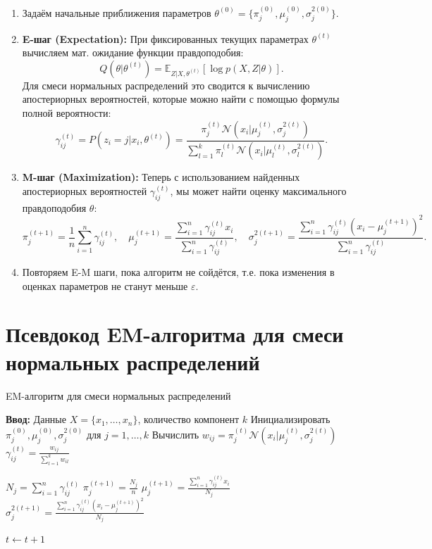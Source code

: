 \begin{enumerate}
    \item Задаём начальные приближения параметров $\theta^{(0)} = \{\pi_j^{(0)}, \mu_j^{(0)}, \sigma_j^{2(0)}\}$.
    \item \textbf{E-шаг (Expectation):} При фиксированных текущих параметрах $\theta^{(t)}$ вычисляем мат. ожидание функции правдоподобия:
    \[
    Q(\theta|\theta^{(t)}) = \mathbb{E}_{Z|X,\theta^{(t)}}[\log p(X,Z|\theta)].
    \]
    Для смеси нормальных распределений это сводится к вычислению апостериорных вероятностей, которые можно найти с помощью формулы полной вероятности:
    \[
    \gamma_{ij}^{(t)} = P(z_i = j | x_i, \theta^{(t)}) = \frac{\pi_j^{(t)}\mathcal{N}(x_i|\mu_j^{(t)},\sigma_j^{2(t)})}{\sum_{l=1}^k \pi_l^{(t)}\mathcal{N}(x_i|\mu_l^{(t)},\sigma_l^{2(t)})}.
    \]

    \item \textbf{M-шаг (Maximization):} Теперь с использованием найденных апостериорных вероятностей $\gamma_{ij}^{(t)}$, мы может найти оценку максимального правдоподобия $\theta$:
    \[
    \pi_j^{(t+1)} = \frac{1}{n}\sum_{i=1}^n \gamma_{ij}^{(t)},\quad
    \mu_j^{(t+1)} = \frac{\sum_{i=1}^n \gamma_{ij}^{(t)} x_i}{\sum_{i=1}^n \gamma_{ij}^{(t)}},\quad
    \sigma_j^{2(t+1)} = \frac{\sum_{i=1}^n \gamma_{ij}^{(t)} (x_i - \mu_j^{(t+1)})^2}{\sum_{i=1}^n \gamma_{ij}^{(t)}}.
    \]

    \item Повторяем E-M шаги, пока алгоритм не сойдётся, т.е. пока изменения в оценках параметров не станут меньше $\varepsilon$.
\end{enumerate}

\section*{\textbf{Псевдокод EM-алгоритма для смеси нормальных распределений}}

\begin{algorithm}[H]
\caption{EM-алгоритм для смеси нормальных распределений}
\begin{algorithmic}[1]
\State \textbf{Ввод:} Данные $X = \{x_1, \dots, x_n\}$, количество компонент $k$
\State Инициализировать $\pi_j^{(0)}, \mu_j^{(0)}, \sigma_j^{2(0)}$ для $j=1,\dots,k$
\Repeat
            \State Вычислить $w_{ij} = \pi_j^{(t)} \mathcal{N}(x_i|\mu_j^{(t)}, \sigma_j^{2(t)})$
        \EndFor
        \State $\gamma_{ij}^{(t)} = \frac{w_{ij}}{\sum_{l=1}^k w_{il}}$
    \EndFor
    
        \State $N_j = \sum_{i=1}^n \gamma_{ij}^{(t)}$
        \State $\pi_j^{(t+1)} = \frac{N_j}{n}$
        \State $\mu_j^{(t+1)} = \frac{\sum_{i=1}^n \gamma_{ij}^{(t)} x_i}{N_j}$
        \State $\sigma_j^{2(t+1)} = \frac{\sum_{i=1}^n \gamma_{ij}^{(t)}(x_i - \mu_j^{(t+1)})^2}{N_j}$
    \EndFor
    
    \State $t \leftarrow t+1$
\end{algorithmic}
\end{algorithm}

